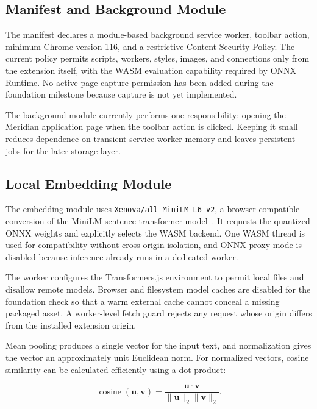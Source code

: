 \documentclass{tietreport}
\begin{document}
\subsection{Manifest and Background Module}

The manifest declares a module-based background service worker, toolbar action, minimum
Chrome version 116, and a restrictive Content Security Policy. The current policy permits
scripts, workers, styles, images, and connections only from the extension itself, with the
WASM evaluation capability required by ONNX Runtime. No active-page capture permission has
been added during the foundation milestone because capture is not yet implemented.

The background module currently performs one responsibility: opening the Meridian application
page when the toolbar action is clicked. Keeping it small reduces dependence on transient
service-worker memory and leaves persistent jobs for the later storage layer.

\subsection{Local Embedding Module}

The embedding module uses \texttt{Xenova/all-MiniLM-L6-v2}, a browser-compatible conversion
of the MiniLM sentence-transformer model~\cite{minilm,xenovaminilm}. It requests the quantized
ONNX weights and explicitly selects the WASM backend. One WASM thread is used for compatibility
without cross-origin isolation, and ONNX proxy mode is disabled because inference already
runs in a dedicated worker.

The worker configures the Transformers.js environment to permit local files and disallow
remote models. Browser and filesystem model caches are disabled for the foundation check so
that a warm external cache cannot conceal a missing packaged asset. A worker-level fetch guard
rejects any request whose origin differs from the installed extension origin.

Mean pooling produces a single vector for the input text, and normalization gives the vector
an approximately unit Euclidean norm. For normalized vectors, cosine similarity can be
calculated efficiently using a dot product:

\begin{equation}
  \operatorname{cosine}(\mathbf{u},\mathbf{v}) =
  \frac{\mathbf{u}\cdot\mathbf{v}}
       {\lVert\mathbf{u}\rVert_2\lVert\mathbf{v}\rVert_2}.
\end{equation}
\end{document}
